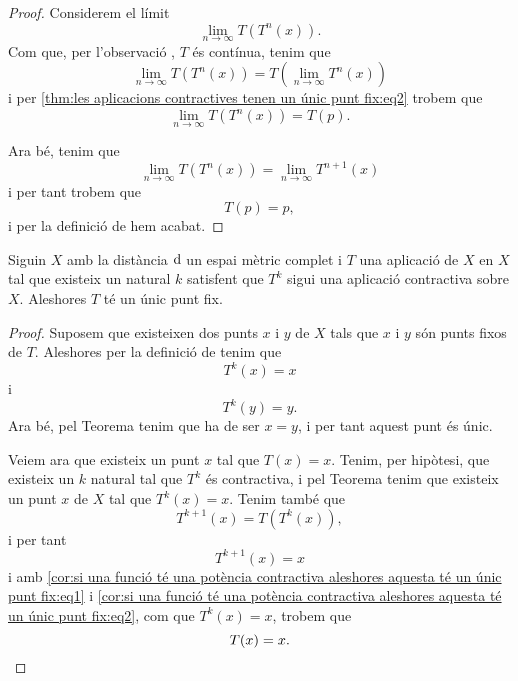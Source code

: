 \documentclass[../Apunts.tex]{subfiles}
\begin{document}
\begin{theorem}
\begin{proof}
			Considerem el límit
			\[\lim_{n\to\infty}T(T^{n}(x)).\]
			Com que, per l'observació , \(T\) és contínua, tenim que %
			\[\lim_{n\to\infty}T(T^{n}(x))=T\left(\lim_{n\to\infty}T^{n}(x)\right)\]
			i per \eqref{thm:les aplicacions contractives tenen un únic punt fix:eq2} trobem que
			\[\lim_{n\to\infty}T(T^{n}(x))=T(p).\]
			
			Ara bé, tenim que 
			\[\lim_{n\to\infty}T(T^{n}(x))=\lim_{n\to\infty}T^{n+1}(x)\]
			i per tant trobem que
			\[T(p)=p,\]
			i per la definició de  hem acabat.
		\end{proof}
	\end{theorem}
	\begin{corollary}
		\label{cor:si una funció té una potència contractiva aleshores aquesta té un únic punt fix}
		Siguin \(X\) amb la distància \(\operatorname{d}\) un espai mètric complet i \(T\) una aplicació de \(X\) en \(X\) tal que existeix un natural \(k\) satisfent que \(T^{k}\) sigui una aplicació contractiva sobre \(X\). Aleshores \(T\) té un únic punt fix.
		\begin{proof}
			Suposem que existeixen dos punts \(x\) i \(y\) de \(X\) tals que \(x\) i \(y\) són punts fixos de \(T\). Aleshores per la definició de  tenim que
			\[T^{k}(x)=x\]
			i
			\[T^{k}(y)=y.\]
			Ara bé, pel Teorema  tenim que ha de ser \(x=y\), i per tant aquest punt és únic. %
			
			Veiem ara que existeix un punt \(x\) tal que \(T(x)=x\). Tenim, per hipòtesi, que existeix un \(k\) natural tal que \(T^{k}\) és contractiva, i pel Teorema  tenim que existeix un punt \(x\) de \(X\) tal que \(T^{k}(x)=x\). Tenim també que
			\begin{equation}
				\label{cor:si una funció té una potència contractiva aleshores aquesta té un únic punt fix:eq1}
				T^{k+1}(x)=T(T^{k}(x)),
			\end{equation}
			i per tant
			\begin{equation}
				\label{cor:si una funció té una potència contractiva aleshores aquesta té un únic punt fix:eq2}
				T^{k+1}(x)=x
			\end{equation}
			i amb \eqref{cor:si una funció té una potència contractiva aleshores aquesta té un únic punt fix:eq1} i \eqref{cor:si una funció té una potència contractiva aleshores aquesta té un únic punt fix:eq2}, com que \(T^{k}(x)=x\), trobem que
			\[T(x)=x.\qedhere\]
		\end{proof}
	\end{corollary}
\end{document}
